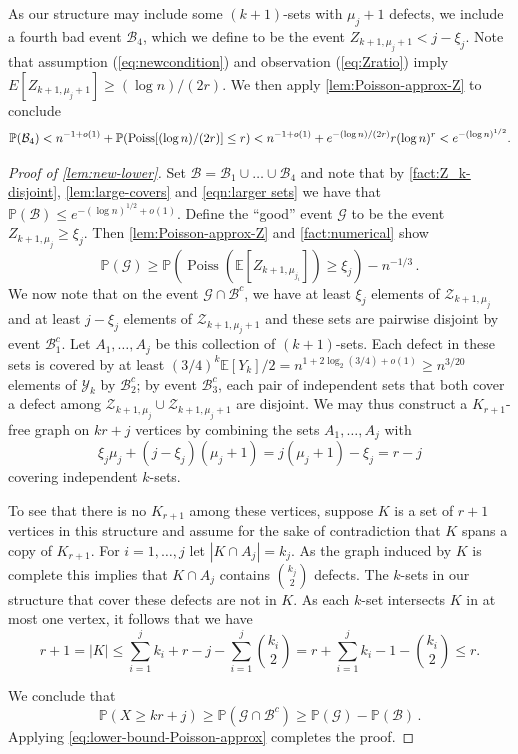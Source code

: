 \documentclass[11pt]{article}
\theoremstyle{definition}
\theoremstyle{remark}
\newcommand{\Poiss}{\operatorname{Poiss}}
\newcommand{\cZ}{\mathcal{Z}}
\newcommand{\cY}{\mathcal{Y}}
\newcommand{\E}{\mathbb{E}}
\newcommand{\PP}{\mathbb{P}}
\newcommand{\cG}{\mathcal{G}}
\newcommand{\cB}{\mathcal{B}}
\begin{document}
As our structure may include some $(k+1)$-sets with $ \mu_j+1$ defects, we include a fourth bad event $ \cB_4$, which we define to
be the event
$ Z_{k+1, \mu_j+1} < j - \xi_j$. Note that assumption (\ref{eq:newcondition}) and observation (\ref{eq:Zratio}) imply $E[ Z_{k+1, \mu_j +1}] \geq (\log n)/(2r)$. We then apply \cref{lem:Poisson-approx-Z} to conclude 
\begin{equation} \label{eqn:larger sets}
\PP( \cB_4) < n^{-1 +o(1)} + \PP( {\rm Poiss}[(\log n)/(2r)] \le r)  < n^{-1 + o(1)} + e^{ -( \log n)/(2r)} r (\log n)^r < e^{-( \log n)^{1/2}}.
\end{equation}
\begin{proof}[Proof of \cref{lem:new-lower}]  
    Set $\cB = \cB_1 \cup \dots \cup \cB_4$ and note that by \cref{fact:Z_k-disjoint},  
    \cref{lem:large-covers} and \eqref{eqn:larger sets} we have that $\PP(\cB) \leq e^{ -( \log n)^{1/2} +o(1)}$.  
    Define the ``good'' event  $\cG$ to be the event $ Z_{k+1,\mu_{j}} \geq \xi_j$. Then \cref{lem:Poisson-approx-Z} and \cref{fact:numerical} show \begin{equation} \label{eq:lower-bound-Poisson-approx}
    \PP(\cG) \geq \PP(\Poiss(\E [Z_{k+1,\mu_{j_i}}]) \geq {\xi_j}) - n^{-1/3}\,.
    \end{equation} We now note that on the event $\cG \cap \cB^c$, we have at least $\xi_j$  elements of $\cZ_{k+1,\mu_{j}}$
    and at least $j - \xi_j$ elements of $ \cZ_{k+1, \mu_j+1}$ and these sets are pairwise disjoint by event $\cB_1^c$. Let $ A_1, \dots, A_j$ be this collection of $(k+1)$-sets. Each defect in these sets is covered by at least $(3/4)^k \E[Y_k]/2 = n^{1 + 2 \log_2(3/4) + o(1)} \geq n^{3/20}$ elements of $\cY_k$ by $\cB_2^c$; 
    by event $\cB_3^c$, each pair of independent sets that both cover a defect among $\cZ_{k+1,\mu_{j}} \cup \cZ_{k+1, \mu_j+1}$ are disjoint.  We may thus construct a $K_{r+1}$-free graph on $kr+j$ vertices by combining the sets $ A_1, \dots, A_j$ with
    \[ \xi_j\mu_j + (j - \xi_j)(\mu_j+1) = j( \mu_j+1) - \xi_j = r-j \]
    covering independent $k$-sets.  
    
    To see that there is no $K_{r+1}$ among these vertices, suppose $K$ is a set of $r+1$ vertices in this structure and assume for the sake of contradiction that $K$ spans a copy of $K_{r+1}$. For $i=1, \dots, j$ let $|K \cap A_j| = k_j$. As the graph induced by $K$ is complete this implies that $ K \cap A_j$ contains $ \binom{k_j}{2}$ defects. The $k$-sets in our structure that cover these defects are not in $K$. As each $k$-set
    intersects $K$ in at most one vertex, it follows that we 
    have
    \[ r+1 = |K| \le \sum_{i=1}^j k_i + r-j - \sum_{i=1}^j \binom{k_i}{2}
    = r + \sum_{i=1}^j k_i - 1 - \binom{k_i}{2} \le r.\]


We conclude that \begin{equation*}
    \PP(X \geq kr + j) \geq \PP(\cG \cap \cB^c) \geq \PP(\cG) - \PP(\cB) \,. \end{equation*}
    Applying \eqref{eq:lower-bound-Poisson-approx} completes the proof.
\end{proof}
\end{document}
